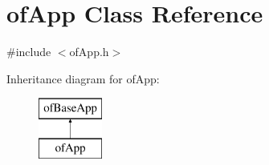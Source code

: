 \hypertarget{classof_app}{}\section{of\+App Class Reference}
\label{classof_app}


{\ttfamily \#include $<$of\+App.\+h$>$}

Inheritance diagram for of\+App\+:\begin{figure}[H]
\begin{center}
\leavevmode
\includegraphics[height=2.000000cm]{classof_app}
\end{center}
\end{figure}
